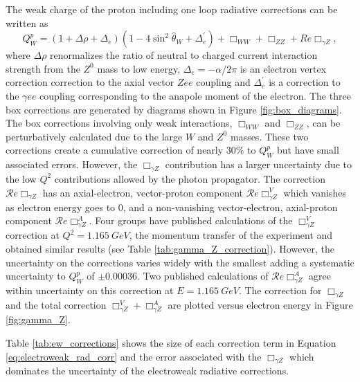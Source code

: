 The weak charge of the proton including one loop radiative corrections can be written as\cite{Erler2003}\cite{Carlson2013}
\begin{equation}
Q_W^p=(1+\Delta\rho+\Delta_e)(1-4\sin^2\hat{\theta}_W+\Delta_e^{\prime})+\Box_{WW}+\Box_{ZZ}+Re\Box_{\gamma Z},
\label{eq:electroweak_rad_corr}
\end{equation}
where $\Delta\rho$ renormalizes the ratio of neutral to charged current interaction strength from the $Z^0$ mass to low energy, $\Delta_e=-\alpha/2\pi$ is an electron vertex correction correction to the axial vector $Zee$ coupling and $\Delta_e^{\prime}$ is a correction to the $\gamma ee$ coupling corresponding to the anapole moment of the electron. The three box corrections are generated by diagrams shown in Figure \ref{fig:box_diagrams}. The box corrections involving only weak interactions, $\Box_{WW}$ and $\Box_{ZZ}$, can be perturbatively calculated due to the large $W$ and $Z^0$ masses\cite{Erler2003}. These two corrections create a cumulative correction of nearly 30\% to $Q_W^p$ but have small associated errors. However, the $\Box_{\gamma Z}$ contribution has a larger uncertainty due to the low $Q^2$ contributions allowed by the photon propagator. The correction $\mathcal{R}e\Box_{\gamma Z}$ has an axial-electron, vector-proton component $\mathcal{R}e\Box_{\gamma Z}^V$ which vanishes as electron energy goes to 0, and a non-vanishing vector-electron, axial-proton component $\mathcal{R}e\Box_{\gamma Z}^A$. Four groups have published calculations of the $\Box_{\gamma Z}^V$ correction at $Q^2=1.165~GeV$, the momentum transfer of the \Qs experiment and obtained similar results (see Table \ref{tab:gamma_Z_correction}). However, the uncertainty on the corrections varies widely with the smallest adding a systematic uncertainty to $Q_W^p$ of $\pm0.00036$. Two published calculations of $\mathcal{R}e\Box_{\gamma Z}^A$ agree within uncertainty on this correction at $E=1.165~GeV$. The correction for $\Box_{\gamma Z}$ and the total correction $\Box_{\gamma Z}^V+\Box_{\gamma Z}^A$ are plotted versus electron energy in Figure \ref{fig:gamma_Z}. 

Table \ref{tab:ew_corrections} shows the size of each correction term in Equation \ref{eq:electroweak_rad_corr} and the error associated with the $\Box_{\gamma Z}$ which dominates the uncertainty of the electroweak radiative corrections.

